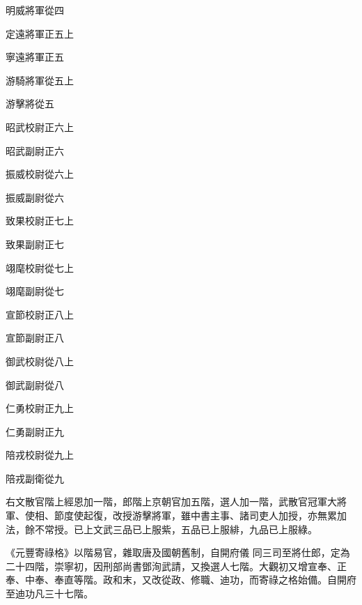 \begin{pinyinscope}
 明威將軍從四



 定遠將軍正五上



 寧遠將軍正五



 游騎將軍從五上



 游擊將從五



 昭武校尉正六上



 昭武副尉正六



 振威校尉從六上



 振威副尉從六



 致果校尉正七上



 致果副尉正七



 翊麾校尉從七上



 翊麾副尉從七



 宣節校尉正八上



 宣節副尉正八



 御武校尉從八上



 御武副尉從八



 仁勇校尉正九上



 仁勇副尉正九



 陪戎校尉從九上



 陪戎副衛從九



 右文散官階上經恩加一階，郎階上京朝官加五階，選人加一階，武散官冠軍大將軍、使相、節度使起復，改授游擊將軍，雖中書主事、諸司吏人加授，亦無累加法，餘不常授。已上文武三品已上服紫，五品已上服緋，九品已上服綠。



 《元豐寄祿格》以階易官，雜取唐及國朝舊制，自開府儀
 同三司至將仕郎，定為二十四階，崇寧初，因刑部尚書鄧洵武請，又換選人七階。大觀初又增宣奉、正奉、中奉、奉直等階。政和末，又改從政、修職、迪功，而寄祿之格始備。自開府至迪功凡三十七階。




\end{pinyinscope}
